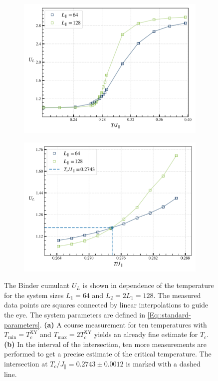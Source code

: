		\begin{figure}[tb]
			\begin{subfigure}{0.475\textwidth}
				\centering
				\includegraphics[width=0.95\linewidth]{graphics/cum_time_avg-Tc.png}
			\end{subfigure}
			\begin{subfigure}{0.475\textwidth}
				\centering
				\includegraphics[width=0.95\linewidth]{graphics/cum_time_avg-Tc-zoom.png}
			\end{subfigure}
			\caption{The Binder cumulant $U_L$ is shown in dependence of the temperature for the system sizes $L_1 =	64$ and $L_2 =	2 L_1 =	128$. The measured data points are squares connected by linear interpolations to guide the eye. The system parameters are defined in \eqref{Eq::standard-parameters}. \textbf{(a)} A course measurement for ten temperatures with $T_{\text{min}} =	T_c^{\text{XY}}$ and $T_{\text{max}} =	2T_c^{\text{XY}}$ yields an already fine estimate for $T_c$. \textbf{(b)} In the interval of the intersection, ten more measurements are performed to get a precise estimate of the critical temperature. The intersection at $T_c /	J_\parallel =	0.2743  \pm 0.0012$ is marked with a dashed line.}
			\label{Fig::Binder-Cum-Intersection}
		\end{figure}
	
